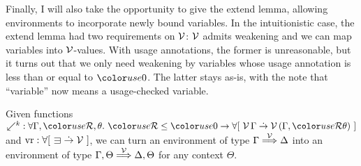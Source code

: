Finally, I will also take the opportunity to give the extend lemma, allowing
environments to incorporate newly bound variables.
In the intuitionistic case, the extend lemma had two requirements on $\mathcal V$: $\mathcal V$
admits weakening and we can map variables into $\mathcal V$-values.
With usage annotations, the former is unreasonable, but it turns out that we
only need weakening by variables whose usage annotation is less than or equal
to $\gr0$.
The latter stays as-is, with the note that ``variable'' now means a
usage-checked variable.

\begin{lemma}[extend]\label{thm:lr-bind}
  Given functions
  ${\swarrow^k} : \forall \Gamma, \grR, \theta.~\grR \leq \gr0 \to
  \forallb{\V\,\Gamma \dotto \V\,\plr{\Gamma, \grR\theta}}$ and
  $\mathrm{vr} : \forallb{{\sqni} \dotto \V}$, we can turn an environment of
  type $\Gamma \stackrel{\mathcal V}\Longrightarrow \Delta$ into an environment of type
  $\Gamma, \Theta \stackrel{\mathcal V}\Longrightarrow \Delta, \Theta$ for any context $\Theta$.
\end{lemma}
